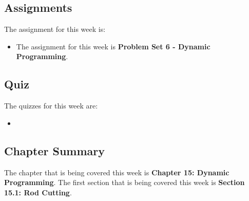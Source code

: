 \subsection{Assignments}

The assignment for this week is:

\begin{itemize}
    \item The assignment for this week is \textbf{Problem Set 6 - Dynamic Programming}. 
\end{itemize}

\subsection{Quiz}

The quizzes for this week are:

\begin{itemize}
    \item {} \textbullet {} 
\end{itemize}

\subsection{Chapter Summary}

The chapter that is being covered this week is \textbf{Chapter 15: Dynamic Programming}. The first section that is being covered this week is \textbf{Section 15.1: Rod Cutting}.

